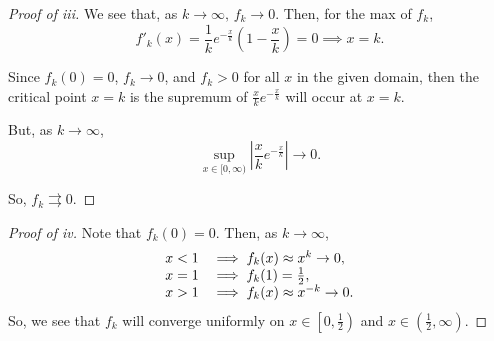 \documentclass[../hw3]{subfiles}
\begin{document}
\begin{proof}[Proof of iii]
	We see that, as $k\to \infty,\, f_k\to 0$.
	Then, for the max of $f_k$,  \[
		f'_k(x)=\frac{1}{k}e^{-\frac{x}{k}}\left( 1-\frac{x}{k} \right) =0 \implies x = k
		.\]

	Since $f_k(0)=0$, $f_k\to 0$, and $f_k>0$ for all $x$ in the given domain, then the critical point $x=k$ is the supremum of $\frac{x}{k}e^{-\frac{x}{k}}$ will occur at $x=k$.

	But, as $k\to \infty$, \[
		\sup_{x \in [0,\infty)} \left|\frac{x}{k}e^{-\frac{x}{k}}\right| \to 0
		.\]

	So, $f_k\rightrightarrows 0$.
\end{proof}
\begin{proof}[Proof of iv]
	Note that $f_k(0)=0$.
	Then, as $k\to \infty$, \[
		\begin{array}{r l}
			x<1   & \implies f_k(x) \approx x^k \to 0,    \\
			x = 1 & \implies f_k(1) = \frac{1}{2},        \\
			x > 1 & \implies f_k(x) \approx x^{-k} \to 0. \\
		\end{array}
	\]
	So, we see that $f_k$ will converge uniformly on $x \in \left[0,\frac{1}{2}\right)$ and $x \in \left(\frac{1}{2}, \infty\right)$.
\end{proof}
\end{document}
